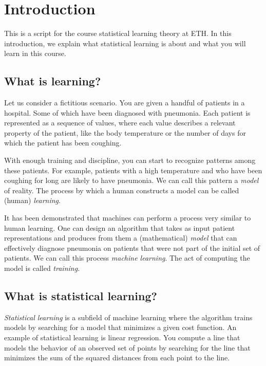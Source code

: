 \chapter*{Introduction}

This is a script for the course statistical learning theory at ETH. In this introduction, we explain what statistical learning is about and what you will learn in this course.

\section*{What is learning?}

Let us consider a fictitious scenario. You are given a handful of patients
in a hospital. Some of which have been diagnosed with pneumonia. Each
patient is represented as a sequence of values, where each value describes a
relevant property of the patient, like the body temperature or the number
of days for which the patient has been coughing.

With enough training and discipline, you can start to recognize patterns
among these patients. For example, patients with a high temperature and
who have been coughing for long are likely to have pneumonia. We can call this pattern a \emph{model} of reality. The process by which a human constructs a model can be called (human) \emph{learning}.

It has been demonstrated that machines can perform a process very
similar to human learning. One can design an algorithm that takes as
input patient representations and produces from them a (mathematical) \emph{model} that can
effectively diagnose pneumonia on patients that were not part of the initial
set of patients. We can call this process \emph{machine learning}. The act of
computing the model is called \emph{training.}

\section*{What is statistical learning?}

\emph{Statistical learning} is a subfield of machine learning where the algorithm
trains models by searching for a model that minimizes a given cost function. An example
of statistical learning is linear regression. You compute a line that models the behavior of 
an observed set of points by searching for the line that minimizes the sum of the squared distances
from each point to the line.

